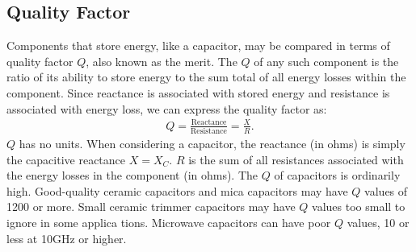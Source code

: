 \documentclass[../../document]{subfiles}
\begin{document}
\subsection{Quality Factor}
Components that store energy, like a capacitor, may be compared in terms of
quality factor \(Q\), also known as the merit. The \(Q\)  of any such component
is the ratio of its ability to store energy to the sum total of all energy
losses within the component. Since reactance is associated with stored energy
and resistance is associated with energy loss, we can express the quality
factor as:
\begin{gather}
	Q=\frac{\text{Reactance}}{\text{Resistance}}=\frac{X}{R}.
\end{gather}
\(Q\)  has no units. When considering a capacitor, the reactance (in ohms) is
simply the capacitive reactance \(X=X_C\).  \(R\) is the sum of all resistances
associated with the energy losses in the component (in ohms). The \(Q\)  of
capacitors is ordinarily high. Good-quality ceramic capacitors and mica
capacitors may have \(Q\)  values of 1200 or more. Small ceramic trimmer
capacitors may have \(Q\) values too small to ignore in some applica tions.
Microwave capacitors can have poor \(Q\)  values, 10 or less at
10\unit{\giga\hertz} or higher. \cite{practical_electronics}
\end{document}

